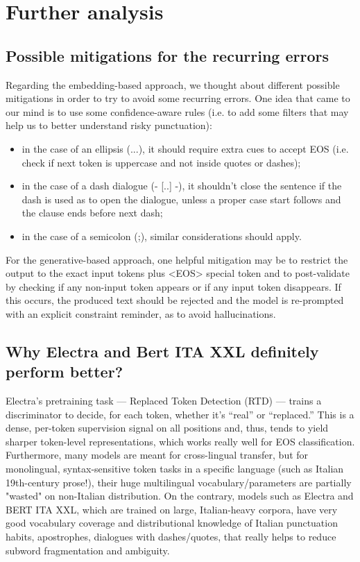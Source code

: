 \documentclass[11pt]{article}
\begin{document}
\appendix

\section{Further analysis}

\subsection{Possible mitigations for the recurring errors}
Regarding the embedding-based approach, we thought about different possible mitigations in order to try to avoid some recurring errors. One idea that came to our mind is to use some confidence-aware rules (i.e. to add some filters that may help us to better understand risky punctuation):
\begin{itemize}
	\item in the case of an ellipsis (...), it should require extra cues to accept EOS (i.e. check if next token is uppercase and not inside quotes or dashes);
	\item in the case of a dash dialogue (- [..] -), it shouldn't close the sentence if the dash is used as to open the dialogue, unless a proper case start follows and the clause ends before next dash;
	\item in the case of a semicolon (;), similar considerations should apply. 
\end{itemize}
For the generative-based approach, one helpful mitigation may be to restrict the output to the exact input tokens plus <EOS> special token and to post-validate by checking if any non-input token appears or if any input token disappears. If this occurs, the produced text should be rejected and the model is re-prompted with an explicit constraint reminder, as to avoid hallucinations.

\subsection{Why Electra and Bert ITA XXL definitely perform better?}
Electra’s pretraining task — Replaced Token Detection (RTD) — trains a discriminator to decide, for each token, whether it’s “real” or “replaced.” This is a dense, per-token supervision signal on all positions and, thus, tends to yield sharper token-level representations, which works really well for EOS classification.
Furthermore, many models are meant for cross-lingual transfer, but for monolingual, syntax-sensitive token tasks in a specific language (such as Italian 19th-century prose!), their huge multilingual vocabulary/parameters are partially "wasted" on non-Italian distribution. On the contrary, models such as Electra and BERT ITA XXL, which are trained on large, Italian-heavy corpora, have very good vocabulary coverage and distributional knowledge of Italian punctuation habits, apostrophes, dialogues with dashes/quotes, that really helps to reduce subword fragmentation and ambiguity.
\end{document}
